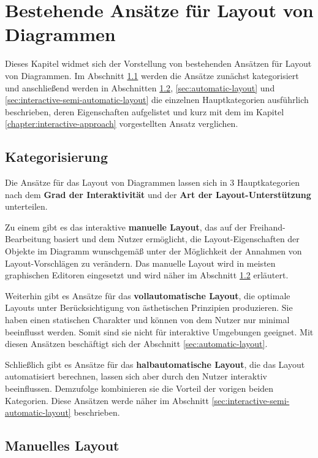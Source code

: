 
\chapter{Bestehende Ansätze für Layout von Diagrammen}

Dieses Kapitel widmet sich der Vorstellung von bestehenden Ansätzen für Layout von Diagrammen. Im Abschnitt \ref{sec:categorization} werden die Ansätze zunächst kategorisiert und anschließend werden in Abschnitten \ref{sec:manual-layout}, \ref{sec:automatic-layout} und \ref{sec:interactive-semi-automatic-layout} die einzelnen Hauptkategorien ausführlich beschrieben, deren Eigenschaften aufgelistet und kurz mit dem im Kapitel \ref{chapter:interactive-approach} vorgestellten Ansatz verglichen.

\section{Kategorisierung}
\label{sec:categorization}

Die Ansätze für das Layout von Diagrammen lassen sich in 3 Hauptkategorien nach dem \textbf{Grad der Interaktivität} und der \textbf{Art der Layout-Unterstützung} unterteilen.

Zu einem gibt es das interaktive \textbf{manuelle Layout}, das auf der Freihand-Bearbeitung basiert und dem Nutzer ermöglicht, die Layout-Eigenschaften der Objekte im Diagramm wunschgemäß unter der Möglichkeit der Annahmen von Layout-Vorschlägen zu verändern. Das manuelle Layout wird in meisten graphischen Editoren eingesetzt und wird näher im Abschnitt \ref{sec:manual-layout} erläutert.

Weiterhin gibt es Ansätze für das \textbf{vollautomatische Layout}, die optimale Layouts unter Berücksichtigung von ästhetischen Prinzipien produzieren. Sie haben einen statischen Charakter und können von dem Nutzer nur minimal beeinflusst werden. Somit sind sie nicht für interaktive Umgebungen geeignet. Mit diesen Ansätzen beschäftigt sich der Abschnitt \ref{sec:automatic-layout}.

Schließlich gibt es Ansätze für das \textbf{halbautomatische Layout}, die das Layout automatisiert berechnen, lassen sich aber durch den Nutzer interaktiv beeinflussen. Demzufolge kombinieren sie die Vorteil der vorigen beiden Kategorien. Diese Ansätzen werde näher im Abschnitt \ref{sec:interactive-semi-automatic-layout} beschrieben.

\section{Manuelles Layout}
\label{sec:manual-layout}

